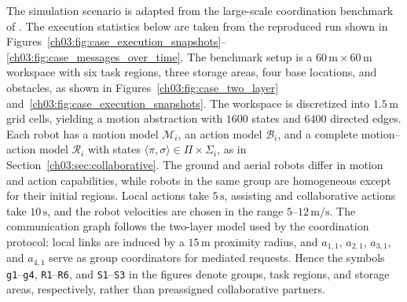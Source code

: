 The simulation scenario is adapted from the large-scale coordination benchmark of
\citet{guo2016task}. The execution statistics below are taken from the
reproduced run shown in
Figures~\ref{ch03:fig:case_execution_snapshots}--
\ref{ch03:fig:case_messages_over_time}. The benchmark setup is a
$60\,\mathrm{m} \times 60\,\mathrm{m}$ workspace with six task regions,
three storage areas, four base locations, and obstacles, as shown in
Figures~\ref{ch03:fig:case_two_layer}
and~\ref{ch03:fig:case_execution_snapshots}. The workspace is discretized into
$1.5\,\mathrm{m}$ grid cells, yielding a motion abstraction with $1600$ states
and $6400$ directed edges.  Each robot has a motion
model $\mathcal{M}_i$, an action model $\mathcal{B}_i$, and a complete
motion--action model $\mathcal{R}_i$ with states
$\langle\pi,\sigma\rangle\in\Pi\times\Sigma_i$, as in
Section~\ref{ch03:sec:collaborative}. The ground and aerial robots differ in
motion and action capabilities, while robots in the same group are homogeneous
except for their initial regions. Local actions take $5\,\mathrm{s}$, assisting
and collaborative actions take $10\,\mathrm{s}$, and the robot velocities are
chosen in the range $5$--$12\,\mathrm{m/s}$. The communication graph follows the
two-layer model used by the coordination protocol: local links are induced by a
$15\,\mathrm{m}$ proximity radius, and $a_{1,1}$, $a_{2,1}$, $a_{3,1}$, and
$a_{4,1}$ serve as group coordinators for mediated requests. Hence the
symbols \texttt{g1}--\texttt{g4}, \texttt{R1}--\texttt{R6}, and
\texttt{S1}--\texttt{S3} in the figures denote groups, task regions, and
storage areas, respectively, rather than preassigned collaborative partners.

